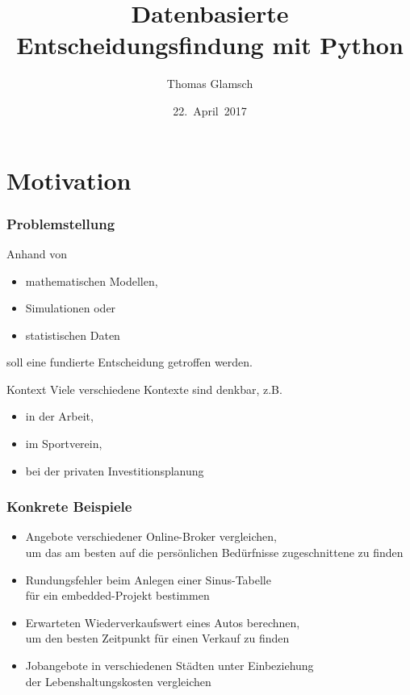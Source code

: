 \documentclass{beamer}
\title{Datenbasierte Entscheidungsfindung mit Python}
\author{Thomas Glamsch}
\date{22.~April~2017}
\begin{document}
\begin{frame}
  \titlepage
\end{frame}

\section{Motivation}

\begin{frame}
  \frametitle{Problemstellung}
  Anhand von
  \begin{itemize}
  \item mathematischen Modellen,
  \item Simulationen oder
  \item statistischen Daten
  \end{itemize}
  soll eine fundierte Entscheidung getroffen werden.

  \pause

  \begin{block}{Kontext}
    Viele verschiedene Kontexte sind denkbar, z.B.
    \begin{itemize}
    \item in der Arbeit,
    \item im Sportverein,
    \item bei der privaten Investitionsplanung
    \end{itemize}
  \end{block}
\end{frame}

\begin{frame}
  \frametitle{Konkrete Beispiele}
  \begin{itemize}
  \item Angebote verschiedener Online-Broker vergleichen, \\ um das am besten auf die pers\"onlichen Bed\"urfnisse zugeschnittene zu finden
  \item Rundungsfehler beim Anlegen einer Sinus-Tabelle \\ f\"ur ein embedded-Projekt bestimmen
  \item Erwarteten Wiederverkaufswert eines Autos berechnen, \\ um den besten Zeitpunkt f\"ur einen Verkauf zu finden
  \item Jobangebote in verschiedenen St\"adten unter Einbeziehung \\ der Lebenshaltungskosten vergleichen
  \end{itemize}
\end{frame}
\end{document}
